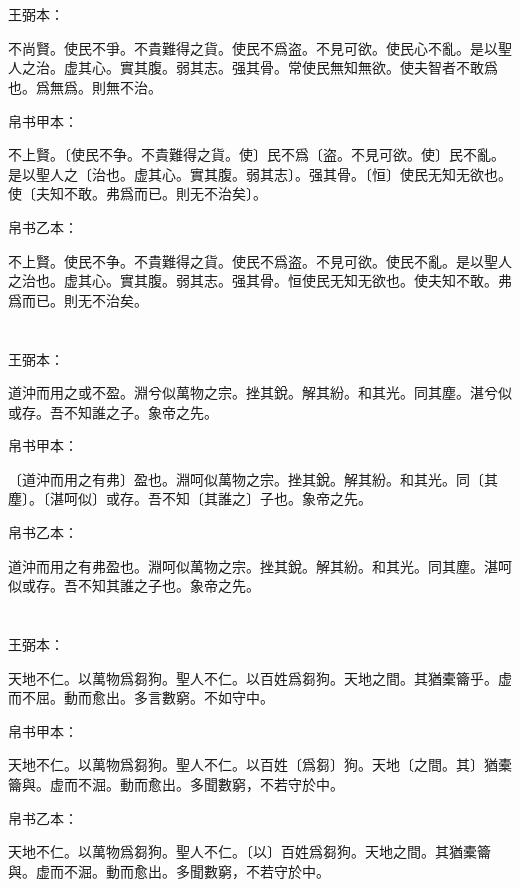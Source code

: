 \documentclass[a5paper]{ctexbook}
\begin{document}
    \chapter{}
    王弼本：

    不尚賢。使民不爭。不貴難得之貨。使民不爲盗。不見可欲。使民心不亂。是以聖人之治。虚其心。實其腹。弱其志。强其骨。常使民無知無欲。使夫智者不敢爲也。爲無爲。則無不治。

    
    帛书甲本：

    不上賢。〔使民不争。不貴難得之貨。使〕民不爲〔盗。不見可欲。使〕民不亂。是以聖人之〔治也。虚其心。實其腹。弱其志〕。强其骨。〔恒〕使民无知无欲也。使〔夫知不敢。弗爲而已。則无不治矣〕。

    帛书乙本：

    不上賢。使民不争。不貴難得之貨。使民不爲盗。不見可欲。使民不亂。是以聖人之治也。虚其心。實其腹。弱其志。强其骨。恒使民无知无欲也。使夫知不敢。弗爲而已。則无不治矣。

    \chapter{}
    王弼本：

    道沖而用之或不盈。淵兮似萬物之宗。挫其銳。解其紛。和其光。同其塵。湛兮似或存。吾不知誰之子。象帝之先。

    
    帛书甲本：

    〔道沖而用之有弗〕盈也。淵呵似萬物之宗。挫其銳。解其紛。和其光。同〔其塵〕。〔湛呵似〕或存。吾不知〔其誰之〕子也。象帝之先。

    帛书乙本：

    道沖而用之有弗盈也。淵呵似萬物之宗。挫其銳。解其紛。和其光。同其塵。湛呵似或存。吾不知其誰之子也。象帝之先。

    \chapter{}
    王弼本：

    天地不仁。以萬物爲芻狗。聖人不仁。以百姓爲芻狗。天地之間。其猶橐籥乎。虚而不屈。動而愈出。多言數窮。不如守中。

    
    帛书甲本：

    天地不仁。以萬物爲芻狗。聖人不仁。以百姓〔爲芻〕狗。天地〔之間。其〕猶橐籥與。虚而不淈。動而愈出。多聞數窮，不若守於中。

    帛书乙本：

    天地不仁。以萬物爲芻狗。聖人不仁。〔以〕百姓爲芻狗。天地之間。其猶橐籥與。虚而不淈。動而愈出。多聞數窮，不若守於中。
\end{document}
